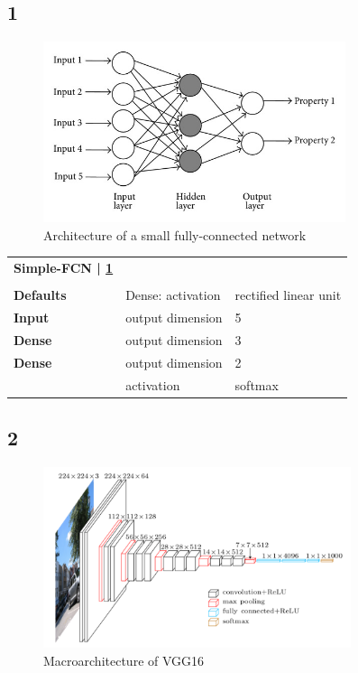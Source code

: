 \subsection*{1}
\begin{figure}[h]
	\centering
	\includegraphics[height=200px]{gfx/Dense_FFNetwork.jpg}
	\caption{Architecture of a small fully-connected network\\
		\cite{dense_network}}
	\label{fig:FFNetwork}
\end{figure}
\begin{tabularx}{\textwidth}[!h]{X X X}
	\multicolumn{1}{c}{\textbf{Simple-FCN | \ref{fig:FFNetwork}}}\\
	\\
	\hline
	\endhead
	\textbf{Defaults} & Dense: activation & rectified linear unit\\
	\hline
	\textbf{Input} & output dimension & 5\\
	[8pt]
	\textbf{Dense} & output dimension & 3\\
	[8pt]
	\textbf{Dense} & output dimension & 2\\
	& activation & softmax\\
	\hline
\end{tabularx}

\newpage

\subsection*{2}

\begin{figure}[h]
	\centering
	\includegraphics[height=200px]{gfx/vgg16.png}
	\caption{Macroarchitecture of VGG16\\
		\cite{VGG16}}
	\label{fig:VGG16}
\end{figure}


